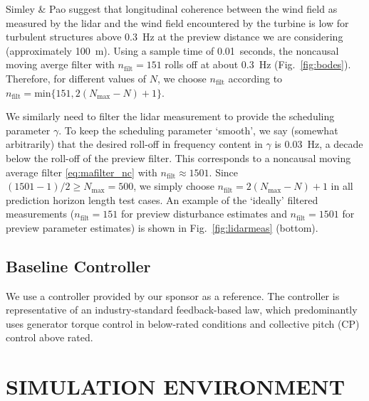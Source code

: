 \documentclass[letterpaper, 10 pt, conference]{ieeeconf}  %
\begin{document}
Simley \& Pao \cite{SimleyPao2015} suggest that longitudinal coherence between the wind field as measured by the lidar and the wind field encountered by the turbine is low for turbulent structures above 0.3~Hz at the preview distance we are considering (approximately 100~m). Using a sample time of 0.01~seconds, the noncausal moving averge filter with $n_\mathrm{filt} = 151$ rolls off at about 0.3~Hz (Fig.~\ref{fig:bodes}). Therefore, for different values of $N$, we choose $n_\mathrm{filt}$ according to $n_\mathrm{filt} = \mathrm{min}\{151, 2(N_\mathrm{max} - N)+1\}$.

We similarly need to filter the lidar measurement to provide the scheduling parameter $\gamma$. To keep the {\color{black}scheduling parameter `smooth', we say (somewhat arbitrarily) that the desired roll-off in frequency content in $\gamma$ is 0.03~Hz}, a decade below the roll-off of the preview filter. This corresponds to a noncausal moving average filter \eqref{eq:mafilter_nc} with $n_\mathrm{filt} \approx 1501$. Since $(1501-1)/2 \geq N_\mathrm{max} = 500$, we simply choose $n_\mathrm{filt} = 2(N_\mathrm{max} - N)+1$ in all prediction horizon length test cases. An example of the `ideally' filtered measurements ($n_\mathrm{filt} = 151$ for preview disturbance estimates and $n_\mathrm{filt} = 1501$ for preview parameter estimates) is shown in Fig.~\ref{fig:lidarmeas} (bottom). 

\subsection{Baseline Controller}

We use a controller provided by our sponsor as a reference. The controller is representative of an industry-standard feedback-based law, which predominantly uses generator torque control in below-rated conditions and collective pitch (CP) control above rated. 


\section{SIMULATION ENVIRONMENT}\label{sec:SimEnv}
\end{document}
